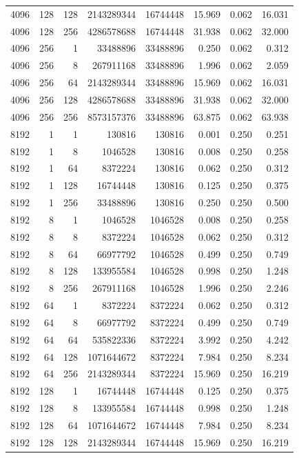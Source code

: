 \begin{longtable}{rrrrrrrr}
4096 & 128 & 128 & 2143289344 & 16744448 & 15.969 & 0.062 & 16.031\\
4096 & 128 & 256 & 4286578688 & 16744448 & 31.938 & 0.062 & 32.000\\
4096 & 256 & 1 & 33488896 & 33488896 & 0.250 & 0.062 & 0.312\\
4096 & 256 & 8 & 267911168 & 33488896 & 1.996 & 0.062 & 2.059\\
4096 & 256 & 64 & 2143289344 & 33488896 & 15.969 & 0.062 & 16.031\\
4096 & 256 & 128 & 4286578688 & 33488896 & 31.938 & 0.062 & 32.000\\
4096 & 256 & 256 & 8573157376 & 33488896 & 63.875 & 0.062 & 63.938\\
8192 & 1 & 1 & 130816 & 130816 & 0.001 & 0.250 & 0.251\\
8192 & 1 & 8 & 1046528 & 130816 & 0.008 & 0.250 & 0.258\\
8192 & 1 & 64 & 8372224 & 130816 & 0.062 & 0.250 & 0.312\\
8192 & 1 & 128 & 16744448 & 130816 & 0.125 & 0.250 & 0.375\\
8192 & 1 & 256 & 33488896 & 130816 & 0.250 & 0.250 & 0.500\\
8192 & 8 & 1 & 1046528 & 1046528 & 0.008 & 0.250 & 0.258\\
8192 & 8 & 8 & 8372224 & 1046528 & 0.062 & 0.250 & 0.312\\
8192 & 8 & 64 & 66977792 & 1046528 & 0.499 & 0.250 & 0.749\\
8192 & 8 & 128 & 133955584 & 1046528 & 0.998 & 0.250 & 1.248\\
8192 & 8 & 256 & 267911168 & 1046528 & 1.996 & 0.250 & 2.246\\
8192 & 64 & 1 & 8372224 & 8372224 & 0.062 & 0.250 & 0.312\\
8192 & 64 & 8 & 66977792 & 8372224 & 0.499 & 0.250 & 0.749\\
8192 & 64 & 64 & 535822336 & 8372224 & 3.992 & 0.250 & 4.242\\
8192 & 64 & 128 & 1071644672 & 8372224 & 7.984 & 0.250 & 8.234\\
8192 & 64 & 256 & 2143289344 & 8372224 & 15.969 & 0.250 & 16.219\\
8192 & 128 & 1 & 16744448 & 16744448 & 0.125 & 0.250 & 0.375\\
8192 & 128 & 8 & 133955584 & 16744448 & 0.998 & 0.250 & 1.248\\
8192 & 128 & 64 & 1071644672 & 16744448 & 7.984 & 0.250 & 8.234\\
8192 & 128 & 128 & 2143289344 & 16744448 & 15.969 & 0.250 & 16.219\\

\end{longtable}
